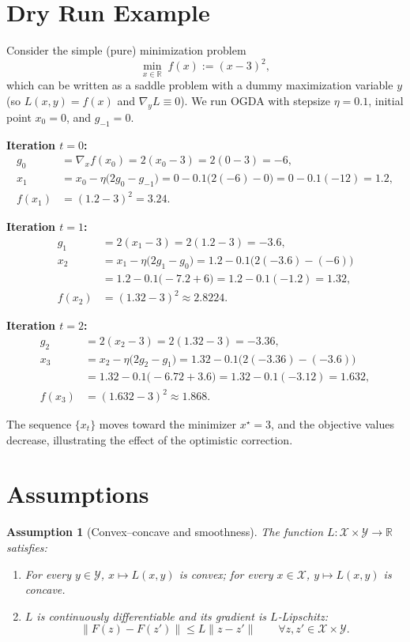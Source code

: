 \documentclass[11pt]{article}
\newtheorem{assumption}{Assumption}
\newcommand{\R}{\mathbb{R}}
\begin{document}
\section*{Dry Run Example}
Consider the simple (pure) minimization problem
\[
\min_{x\in\R} \; f(x):=(x-3)^2,
\]
which can be written as a saddle problem with a dummy maximization variable $y$ (so $L(x,y)=f(x)$ and $\nabla_y L\equiv0$).  
We run OGDA with stepsize $\eta=0.1$, initial point $x_0=0$, and $g_{-1}=0$.

\bigskip
\noindent\textbf{Iteration $t=0$:}
\[
\begin{aligned}
g_0&=\nabla_x f(x_0)=2(x_0-3)=2(0-3)=-6,\\
x_{1}&=x_0-\eta\bigl(2g_0-g_{-1}\bigr)
      =0-0.1\bigl(2(-6)-0\bigr)=0-0.1(-12)=1.2,\\
f(x_1)&=(1.2-3)^2=3.24.
\end{aligned}
\]

\noindent\textbf{Iteration $t=1$:}
\[
\begin{aligned}
g_1&=2(x_1-3)=2(1.2-3)=-3.6,\\
x_{2}&=x_1-\eta\bigl(2g_1-g_{0}\bigr)
      =1.2-0.1\bigl(2(-3.6)-(-6)\bigr)\\
      &=1.2-0.1\bigl(-7.2+6\bigr)=1.2-0.1(-1.2)=1.32,\\
f(x_2)&=(1.32-3)^2\approx2.8224.
\end{aligned}
\]

\noindent\textbf{Iteration $t=2$:}
\[
\begin{aligned}
g_2&=2(x_2-3)=2(1.32-3)=-3.36,\\
x_{3}&=x_2-\eta\bigl(2g_2-g_{1}\bigr)
      =1.32-0.1\bigl(2(-3.36)-(-3.6)\bigr)\\
      &=1.32-0.1\bigl(-6.72+3.6\bigr)=1.32-0.1(-3.12)=1.632,\\
f(x_3)&=(1.632-3)^2\approx1.868.
\end{aligned}
\]

The sequence $\{x_t\}$ moves toward the minimizer $x^\star=3$, and the objective values decrease, illustrating the effect of the optimistic correction.

\section*{Assumptions}
\begin{assumption}[Convex–concave and smoothness]\label{assump:smooth}
The function $L:\mathcal X\times\mathcal Y\rightarrow\R$ satisfies:
\begin{enumerate}[label=(\roman*)]
\item For every $y\in\mathcal Y$, $x\mapsto L(x,y)$ is convex; for every $x\in\mathcal X$, $y\mapsto L(x,y)$ is concave.
\item $L$ is continuously differentiable and its gradient is $L$‑Lipschitz:
\[
\|F(z)-F(z')\|\le L\|z-z'\|\qquad\forall z,z'\in\mathcal X\times\mathcal Y.
\tag{A1}
\]
\end{enumerate}
\end{assumption}
\end{document}
